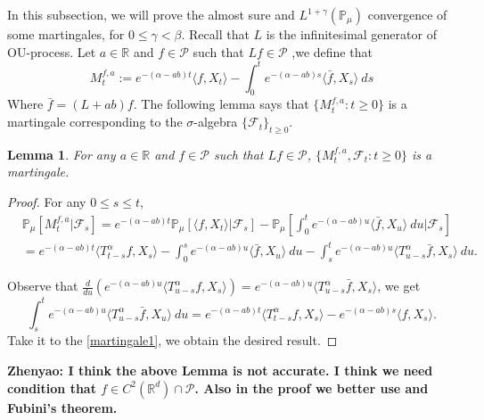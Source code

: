 \documentclass[12pt, a4paper]{amsart}
\newtheorem{lem}[thm]{Lemma}
\theoremstyle{definition}
\numberwithin{equation}{section}
\begin{document}
In this subsection, we will prove the almost sure and $L^{1+\gamma}(\mathbb{P}_{\mu})$ convergence of some martingales, for $0\leq\gamma<\beta$. Recall that $L$ is the infinitesimal generator of OU-process. Let $a\in \mathbb{R}$ and $f\in \mathcal{P}$ such that $Lf \in \mathcal{P}$ ,we define that
$$M_t^{f,a}:=e^{-(\alpha-ab)t}\langle f,X_t\rangle-\int_0^t e^{-(\alpha-ab)s}\langle \bar{f}, X_s\rangle~ ds$$
Where $\bar{f}=(L+ab)f$. The following lemma says that $\{M_t^{f,a}: t\geq 0\}$ is a martingale corresponding to the $\sigma$-algebra $\{\mathcal{F}_t\}_{t\geq 0}$.
\begin{lem}\label{lemma25}
For any $a \in \mathbb{R}$ and $f\in\mathcal{P}$ such that $L f\in\mathcal{P}$, $\{M_t^{f,a},\mathcal{F}_t:t\geq 0\}$ is a martingale.
\end{lem}

\begin{proof}
For any $0\leq s\leq t$,
\begin{align}
\label{martingale1}
    &\mathbb{P}_{\mu}\left[M_t^{f,a}|\mathcal{F}_s\right] 
    =e^{-(\alpha-ab)t}\mathbb{P}_{\mu}\left[\langle f,X_t\rangle|\mathcal{F}_s\right]-\mathbb{P}_{\mu}\left[\int_0^t e^{-(\alpha-ab)u}\langle \bar{f}, X_u\rangle~ du|\mathcal{F}_s\right]
    \\&=e^{-(\alpha-ab)t}\langle T_{t-s}^{\alpha}f, X_s\rangle-\int_0^s e^{-(\alpha-ab)u}\langle \bar{f}, X_u\rangle~ du -\int_s^t e^{-(\alpha-ab)u}\langle T_{u-s}^{\alpha} \bar{f},X_s\rangle~ du.
\end{align}

Observe that $\frac{d}{du}\left(e^{-(\alpha-ab)u}\langle T_{u-s}^{\alpha}f,X_s\rangle\right)=e^{-(\alpha-ab)u}\langle T_{u-s}^{\alpha}\bar{f},X_s\rangle$, we get
$$\int_s^t e^{-(\alpha-ab)u}\langle T_{u-s}^{\alpha} \bar{f},X_u\rangle~ du=e^{-(\alpha-ab)t}\langle T_{t-s}^{\alpha}f,X_s\rangle-e^{-(\alpha-ab)s}\langle f,X_s\rangle.$$
Take it to the \eqref{martingale1}, we obtain the desired result.
\end{proof}
{\bf Zhenyao: I think the above Lemma is not accurate. I think we need condition that $f\in C^2(\mathbb R^d) \cap \mathcal P$. Also in the proof we better use \cite[Theorem A.55]{Li2011Measure-valued} and Fubini's theorem.}
\end{document}
